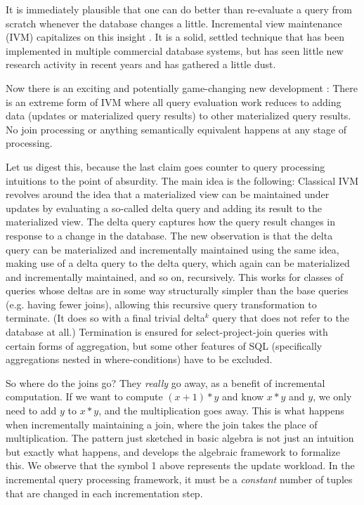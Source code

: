 
It is immediately plausible that one can do better than re-evaluate a query from scratch whenever the database changes a little. Incremental view maintenance (IVM) capitalizes on this insight \cite{DBLP:journals/tods/BunemanC79,DBLP:conf/sigmod/ShmueliI84,DBLP:conf/sigmod/BlakeleyLT86,roussopoulos-tods:91,DBLP:conf/vldb/CeriW91,DBLP:conf/deductive/GuptaKM92,DBLP:conf/sigmod/GuptaMS93,griffin-sigmod:95,yan-vldb:95,DBLP:journals/iandc/DongS95,GHJ1996,colby-sigmod:96,DBLP:conf/dbpl/LibkinW97a,DBLP:conf/dbpl/LibkinW99,DBLP:journals/jcss/PatnaikI97,kotidis-tods:01}. It is a solid, settled technique that has been implemented in multiple commercial database systems, but has seen little new research activity in recent years and has gathered a little dust.

Now there is an exciting and potentially game-changing new development \cite{ahmad-vldb:09, koch-pods:10, kennedy-ahmad-koch-cidr:11}: There is an extreme form of IVM where all query evaluation work reduces to adding data (updates or materialized query results) to other materialized query results.  No join processing or anything semantically equivalent happens at any stage of processing.

Let us digest this, because the last claim goes counter to query processing intuitions to the point of absurdity. The main idea is the following: Classical IVM revolves around the idea that a materialized view can be maintained under updates by evaluating a so-called delta query and adding its result to the materialized view. The delta query captures how the query result changes in response to a change in the database. The new observation is that the delta query can be materialized and incrementally maintained using the same idea, making use of a delta query to the delta query, which again can be materialized and incrementally maintained, and so on, recursively. This works for classes of queries whose deltas are in some way structurally simpler than the base queries (e.g. having fewer joins), allowing this recursive query transformation to terminate. (It does so with a final trivial delta$^k$ query that does not refer to the database at all.) Termination is ensured for select-project-join queries with certain forms of aggregation, but some other features of SQL (specifically aggregations nested in where-conditions) have to be excluded. 

So where do the joins go? They {\em really} go away, as a benefit of incremental computation. If we want to compute $(x+1)*y$ and know $x*y$ and $y$, we only need to add $y$ to $x*y$, and the multiplication goes away. This is what happens when incrementally maintaining a join, where the join takes the place of multiplication. The pattern just sketched in basic algebra is not just an intuition but exactly what happens, and \cite{koch-pods:10} develops the algebraic framework to formalize this. We observe that the symbol 1 above represents the update workload.  In the incremental query processing framework, it must be a {\em constant} number of tuples that are changed in each incrementation step.

